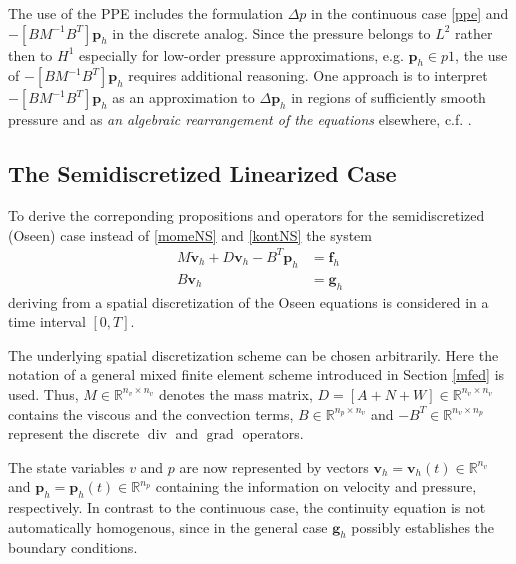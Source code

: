 \documentclass[a4paper,10pt,BCOR=15mm]{scrbook}
\DeclareMathOperator{\dive}{div}
\DeclareMathOperator{\grad}{grad}
\begin{document}
\begin{rem}
The use of the PPE includes the formulation $ \Delta p$ in the continuous case \eqref{ppe} and $-[BM^{-1}B^T]\mathbf p_h$ in the discrete analog. Since the pressure belongs to $L^2$ rather then to $H^1$ especially for low-order pressure approximations, e.g. $\mathbf p_h \in p1$, the use of $-[BM^{-1}B^T]\mathbf p_h$ requires additional reasoning. One approach is to interpret $-[BM^{-1}B^T]\mathbf p_h$ as an approximation to $ \Delta \mathbf p_h$ in regions of sufficiently smooth pressure and as \textit{an algebraic rearrangement of the equations} elsewhere, c.f. \cite[p.~642]{gre2}.
\end{rem}


\subsection{The Semidiscretized Linearized Case}

To derive the correponding propositions and operators for the semidiscretized (Oseen) case instead of \eqref{momeNS} and \eqref{kontNS} the system 
\begin{align}
 M\dot {\mathbf v}_h + D{\mathbf v}_h  -B^T {\mathbf p}_h &= {\mathbf f}_h   \label{momDi}\\
 B{\mathbf v}_h &= \mathbf g_h  \label{konDi}
\end{align}
deriving from a spatial discretization of the Oseen equations is considered in a time interval $[0,T]$. 

The underlying spatial discretization scheme can be chosen arbitrarily. Here the notation of a general mixed finite element scheme introduced in Section \ref{mfed} is used. Thus, $M \in \mathbb R ^{n_v \times n_v}$ denotes the mass matrix, $D=[A+N+W]\in \mathbb R ^{n_v \times n_v}$ contains the viscous and the convection terms, $B \in \mathbb R ^{n_p \times n_v}$ and $-B^T\in \mathbb R ^{n_v \times n_p}$ represent the discrete $ \dive $ and $\grad$ operators. 

The state variables $v$ and $p$ are now represented by vectors $\mathbf  v_h = \mathbf  v_h(t) \in \mathbb R^{n_v}$ and $\mathbf p_h=\mathbf p_h(t)\in \mathbb R^{n_p}$ containing the information on velocity and pressure, respectively. In contrast to the continuous case, the continuity equation is not automatically homogenous, since in the general case $\mathbf g_h$ possibly establishes the boundary conditions. 
\end{document}
